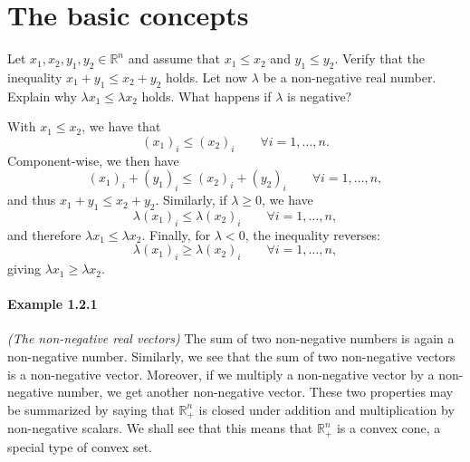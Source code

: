 \section{The basic concepts}

\begin{exercise}
  Let \( x_1, x_2, y_1, y_2 \in \mathbb{R}^n \) and assume that $x_1 \leq x_2$ and $y_1 \leq y_2$.
  Verify that the inequality $x_1 + y_1 \leq x_2 + y_2$ holds.
  Let now $\lambda$ be a non-negative real number.
  Explain why $\lambda x_1 \leq \lambda x_2$ holds.
  What happens if $\lambda$ is negative?
\end{exercise}

\begin{solution}
  With $x_1 \leq x_2$, we have that
  \begin{equation}
    (x_1)_i \leq (x_2)_i \qquad \forall i = 1, \ldots, n.
  \end{equation}
  Component-wise, we then have
  \begin{equation}
    (x_1)_i + (y_1)_i \leq (x_2)_i + (y_2)_i \qquad \forall i = 1, \ldots, n,
  \end{equation}
  and thus $x_1 + y_1 \leq x_2 + y_2$.
  Similarly, if $\lambda \geq 0$, we have
  \begin{equation}
    \lambda (x_1)_i \leq \lambda (x_2)_i \qquad \forall i = 1, \ldots, n,
  \end{equation}
  and therefore $\lambda x_1 \leq \lambda x_2$.
  Finally, for $\lambda < 0$, the inequality reverses:
  \begin{equation}
    \lambda (x_1)_i \geq \lambda (x_2)_i \qquad \forall i = 1, \ldots, n,
  \end{equation}
  giving $\lambda x_1 \geq \lambda x_2$.
\end{solution}

\paragraph{Example 1.2.1}
\emph{(The non-negative real vectors)}
The sum of two non-negative numbers is again a non-negative number.
Similarly, we see that the sum of two non-negative vectors is a non-negative vector.
Moreover, if we multiply a non-negative vector by a non-negative number, we get another non-negative vector.
These two properties may be summarized by saying that $\mathbb{R}^n_+$ is closed under addition and multiplication by non-negative scalars.
We shall see that this means that $\mathbb{R}^n_+$ is a convex cone, a special type of convex set.

